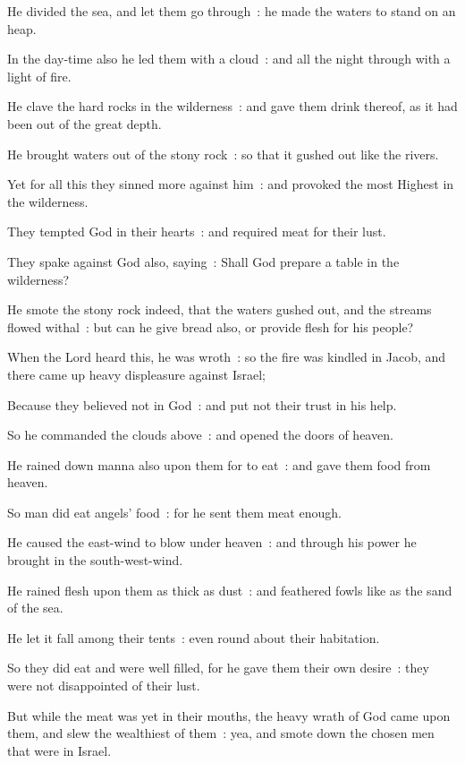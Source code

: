 He divided the sea, and let them go through~: he made the waters to stand on an heap.\par
{}In the day-time also he led them with a cloud~: and all the night through with a light of fire.\par
{}He clave the hard rocks in the wilderness~: and gave them drink thereof, as it had been out of the great depth.\par
{}He brought waters out of the stony rock~: so that it gushed out like the rivers.\par
{}Yet for all this they sinned more against him~: and provoked the most Highest in the wilderness.\par
{}They tempted God in their hearts~: and required meat for their lust.\par
{}They spake against God also, saying~: Shall God prepare a table in the wilderness?\par
{}He smote the stony rock indeed, that the waters gushed out, and the streams flowed withal~: but can he give bread also, or provide flesh for his people?\par
{}When the Lord heard this, he was wroth~: so the fire was kindled in Jacob, and there came up heavy displeasure against Israel;\par
{}Because they believed not in God~: and put not their trust in his help.\par
{}So he commanded the clouds above~: and opened the doors of heaven.\par
{}He rained down manna also upon them for to eat~: and gave them food from heaven.\par
{}So man did eat angels' food~: for he sent them meat enough.\par
{}He caused the east-wind to blow under heaven~: and through his power he brought in the south-west-wind.\par
{}He rained flesh upon them as thick as dust~: and feathered fowls like as the sand of the sea.\par
{}He let it fall among their tents~: even round about their habitation.\par
{}So they did eat and were well filled, for he gave them their own desire~: they were not disappointed of their lust.\par
{}But while the meat was yet in their mouths, the heavy wrath of God came upon them, and slew the wealthiest of them~: yea, and smote down the chosen men that were in Israel.\par
